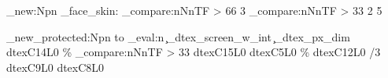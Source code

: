 \cs_new:Npn \dtex_face_skin:
  {
    \int_compare:nNnTF {  } > {66} {3}
      { \int_compare:nNnTF {  } > {33} {2} {5} }
  }

\cs_new_protected:Npn \dtexRenderHUD
  {
    \hbox to \dim_eval:n { \c_dtex_screen_w_int \c_dtex_px_dim }
      {
        \ttfamily
         {  } {dtexC14L0} \hfill
         {  \% }
          { \int_compare:nNnTF {  } > {33} {dtexC15L0} {dtexC5L0} } \hfill
        \raisebox{-2bp}{\dtexFaceBox} \hfill
         {  \% } {dtexC12L0} \hfill
         {  /3 } {dtexC9L0} \hfill
         {  } {dtexC8L0}
      }
  }

\ExplSyntaxOff

